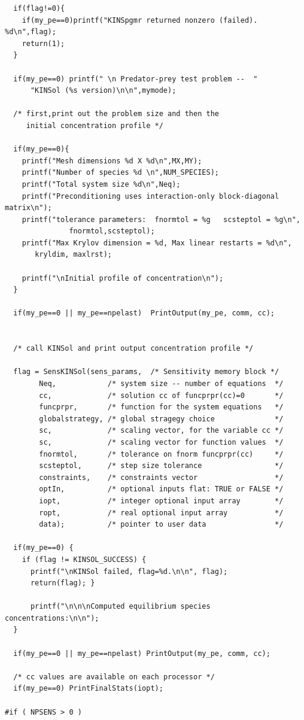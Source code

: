 \documentclass[11pt]{article}
\begin{document}
\begin{verbatim}
  if(flag!=0){
    if(my_pe==0)printf("KINSpgmr returned nonzero (failed). %d\n",flag);
    return(1);
  }

  if(my_pe==0) printf(" \n Predator-prey test problem --  "
      "KINSol (%s version)\n\n",mymode);

  /* first,print out the problem size and then the
     initial concentration profile */

  if(my_pe==0){
    printf("Mesh dimensions %d X %d\n",MX,MY);
    printf("Number of species %d \n",NUM_SPECIES);
    printf("Total system size %d\n",Neq);
    printf("Preconditioning uses interaction-only block-diagonal matrix\n");
    printf("tolerance parameters:  fnormtol = %g   scsteptol = %g\n",
	           fnormtol,scsteptol);
    printf("Max Krylov dimension = %d, Max linear restarts = %d\n",
       kryldim, maxlrst);

    printf("\nInitial profile of concentration\n");
  }

  if(my_pe==0 || my_pe==npelast)  PrintOutput(my_pe, comm, cc);


  /* call KINSol and print output concentration profile */

  flag = SensKINSol(sens_params,  /* Sensitivity memory block */
		Neq,            /* system size -- number of equations  */
		cc,             /* solution cc of funcprpr(cc)=0       */
		funcprpr,       /* function for the system equations   */
		globalstrategy, /* global stragegy choice              */
		sc,             /* scaling vector, for the variable cc */
		sc,             /* scaling vector for function values  */
		fnormtol,       /* tolerance on fnorm funcprpr(cc)     */
		scsteptol,      /* step size tolerance                 */
		constraints,    /* constraints vector                  */
		optIn,          /* optional inputs flat: TRUE or FALSE */
		iopt,           /* integer optional input array        */
		ropt,           /* real optional input array           */
		data);          /* pointer to user data                */

  if(my_pe==0) {
    if (flag != KINSOL_SUCCESS) {
      printf("\nKINSol failed, flag=%d.\n\n", flag);
      return(flag); }

      printf("\n\n\nComputed equilibrium species concentrations:\n\n");
  }

  if(my_pe==0 || my_pe==npelast) PrintOutput(my_pe, comm, cc);

  /* cc values are available on each processor */
  if(my_pe==0) PrintFinalStats(iopt);

#if ( NPSENS > 0 )


\end{verbatim}
\end{document}
